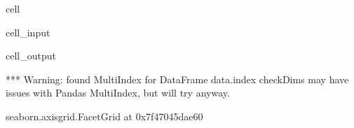 \documentclass[letterpaper,table,10pt,english]{jupyterBook}
\begin{document}
\begin{sphinxuseclass}{cell}\begin{sphinxVerbatimInput}

\begin{sphinxuseclass}{cell_input}
\begin{sphinxVerbatim}[commandchars=\\\{\}]
  
     
                 
                     
\end{sphinxVerbatim}

\end{sphinxuseclass}\end{sphinxVerbatimInput}
\begin{sphinxVerbatimOutput}

\begin{sphinxuseclass}{cell_output}
\begin{sphinxVerbatim}[commandchars=\\\{\}]
*** Warning: found MultiIndex for DataFrame data.index \PYGZhy{} checkDims may have issues with Pandas MultiIndex, but will try anyway.
\end{sphinxVerbatim}

\begin{sphinxVerbatim}[commandchars=\\\{\}]
\PYGZlt{}seaborn.axisgrid.FacetGrid at 0x7f47045dae60\PYGZgt{}
\end{sphinxVerbatim}

\noindent{}

\end{sphinxuseclass}\end{sphinxVerbatimOutput}

\end{sphinxuseclass}
\end{document}
